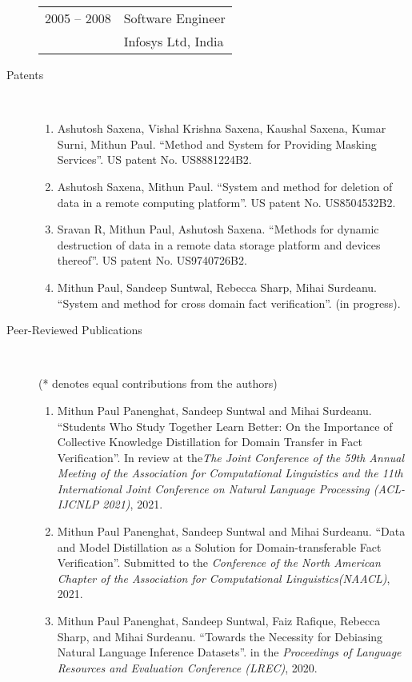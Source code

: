 \documentclass[10pt]{article}
\newcommand{\ve}[1]{{\em #1}} %
\newcommand{\ti}[1]{``#1''} %
\begin{document}
\begin{description}
\begin{tabular}{lp{4.9in}}
\hspace{-.2cm}2005 -- 2008 & Software Engineer	\\
& {\sc Infosys Ltd, India}
\end{tabular}

\item [Patents] \
\begin{enumerate}


\item
Ashutosh Saxena, Vishal Krishna Saxena, Kaushal Saxena, Kumar Surni, Mithun Paul. \ti{Method and System for Providing Masking Services}.  US patent No. US8881224B2.
\item
Ashutosh Saxena, Mithun Paul. \ti{System and method for deletion of data in a remote computing platform}.  US patent No. US8504532B2.
\item
Sravan R, Mithun Paul, Ashutosh Saxena. \ti{Methods for dynamic destruction of data in a remote data storage platform and devices thereof}.  US patent No. US9740726B2.
\item
Mithun Paul, Sandeep Suntwal, Rebecca Sharp, Mihai Surdeanu. \ti{System and method for cross domain fact verification}. (in progress).

\end{enumerate}
\bigskip
\item [ Peer-Reviewed  Publications]\


(* denotes equal contributions from the authors)

\begin{enumerate}



\item Mithun Paul Panenghat, Sandeep Suntwal and Mihai Surdeanu.   \ti{Students Who Study Together Learn Better: On the Importance of Collective Knowledge Distillation for Domain Transfer in Fact Verification}. In review at the\ve {The Joint Conference of the 59th Annual Meeting of the Association for Computational Linguistics and the 11th International Joint Conference on Natural Language Processing (ACL-IJCNLP 2021)}, 2021.



\item Mithun Paul Panenghat, Sandeep Suntwal and Mihai Surdeanu.   \ti{Data and Model Distillation as a Solution for Domain-transferable Fact Verification}. Submitted to the \ve{Conference of the North American Chapter of the Association for Computational Linguistics(NAACL)}, 2021.

\item Mithun Paul Panenghat, Sandeep Suntwal, Faiz Rafique, Rebecca Sharp, and Mihai Surdeanu.   \ti{Towards the Necessity for Debiasing Natural Language Inference Datasets}. in the \ve{ Proceedings of Language Resources and Evaluation Conference (LREC)}, 2020.


\end{enumerate}
\end{description}
\end{document}
